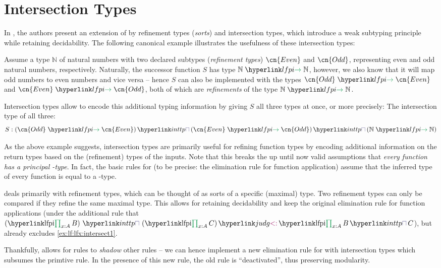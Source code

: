 \section{Intersection Types}\label{sec:lf:lfx:intersect}
In \cite{Pfenning93}, the authors present an extension of \LF by refinement types (\emph{sorts}) and \hypertarget{inttp}{intersection types}, which introduce a weak subtyping principle while retaining decidability. The following canonical example illustrates the usefulness of these intersection types:
\begin{example}\label{ex:lf:lfx:intersect1}
	Assume a type $\mathbb N$ of natural numbers with two declared subtypes (\emph{refinement types}) $\cn{Even}$ and $\cn{Odd}$, representing even and odd natural numbers, respectively. Naturally, the successor function $S$ has type $\lfarrow{\mathbb N}{\mathbb N}$, however, we also know that it will map odd numbers to even numbers and vice versa -- hence $S$ can also be implemented with the types $\lfarrow{\cn{Odd}}{\cn{Even}}$ and $\lfarrow{\cn{Even}}{\cn{Odd}}$, both of which are \emph{refinements} of the type $\lfarrow{\mathbb N}{\mathbb N}$. 
	
	Intersection types allow to encode this additional typing information by giving $S$ all three types at once, or more precisely: The intersection type of all three:
	\[ S: \inttp{(\lfarrow{\cn{Odd}}{\cn{Even}})}{\inttp{(\lfarrow{\cn{Even}}{\cn{Odd}})}{(\lfarrow{\mathbb N}{\mathbb N})}} \]
\end{example}
\begin{remark}
As the above example suggests, intersection types are primarily useful for refining function types by encoding additional information on the return types based on the (refinement) types of the inputs. Note that this breaks the up until now valid assumptions that \emph{every function has a principal \lfpisym-type}. In fact, the basic rules for \LF (to be precise: the elimination rule for function application) assume that the inferred type of every function is equal to a \lfpisym-type.

\cite{Pfenning93} deals primarily with refinement types, which can be thought of as sorts of a specific (maximal) type. Two refinement types can only be compared if they refine the same maximal type. This allows for retaining decidability and keep the original elimination rule for function applications (under the additional rule that $\subtp{\inttp{\left(\lfpi{x:A}B\right)}{\left(\lfpi{x:A}C\right)}}{\lfpi{x:A}{\inttp BC}}$), but already excludes \autoref{ex:lf:lfx:intersect1}.

 Thankfully, \mmt allows for rules to \emph{shadow} other rules -- we can hence implement a new elimination rule for \LF with intersection types which subsumes the primtive \LF rule. In the presence of this new rule, the old rule is ``deactivated'', thus preserving modularity.
\end{remark}
